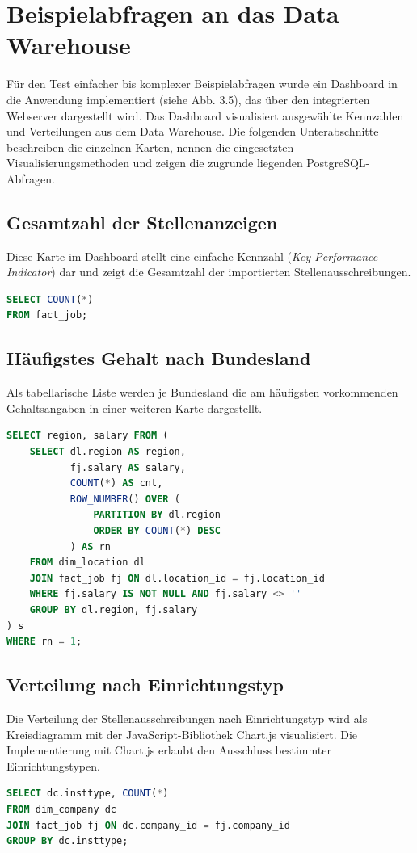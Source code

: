 \documentclass[
    a4paper,
    12pt,
    headinclude=true,
    BCOR=10mm,
]{scrreprt}
\begin{document}
\section{Beispielabfragen an das Data Warehouse}
Für den Test einfacher bis komplexer Beispielabfragen wurde ein Dashboard in die Anwendung implementiert (siehe Abb. 3.5), das über den integrierten Webserver dargestellt wird. Das Dashboard visualisiert ausgewählte Kennzahlen und Verteilungen aus dem Data Warehouse. Die folgenden Unterabschnitte beschreiben die einzelnen Karten, nennen die eingesetzten Visualisierungsmethoden und zeigen die zugrunde liegenden PostgreSQL-Abfragen.

\subsection{Gesamtzahl der Stellenanzeigen}
Diese Karte im Dashboard stellt eine einfache Kennzahl (\emph{Key Performance Indicator}) dar und zeigt die Gesamtzahl der importierten Stellenausschreibungen.
\begin{lstlisting}[language=SQL]
SELECT COUNT(*)
FROM fact_job;
\end{lstlisting}

\subsection{Häufigstes Gehalt nach Bundesland}
Als tabellarische Liste werden je Bundesland die am häufigsten vorkommenden Gehaltsangaben in einer weiteren Karte dargestellt.
\begin{lstlisting}[language=SQL]
SELECT region, salary FROM (
    SELECT dl.region AS region,
           fj.salary AS salary,
           COUNT(*) AS cnt,
           ROW_NUMBER() OVER (
               PARTITION BY dl.region
               ORDER BY COUNT(*) DESC
           ) AS rn
    FROM dim_location dl
    JOIN fact_job fj ON dl.location_id = fj.location_id
    WHERE fj.salary IS NOT NULL AND fj.salary <> ''
    GROUP BY dl.region, fj.salary
) s
WHERE rn = 1;
\end{lstlisting}

\subsection{Verteilung nach Einrichtungstyp}
Die Verteilung der Stellenausschreibungen nach Einrichtungstyp wird als Kreisdiagramm mit der JavaScript-Bibliothek Chart.js visualisiert. Die Implementierung mit Chart.js erlaubt den Ausschluss bestimmter Einrichtungstypen.
\begin{lstlisting}[language=SQL]
SELECT dc.insttype, COUNT(*)
FROM dim_company dc
JOIN fact_job fj ON dc.company_id = fj.company_id
GROUP BY dc.insttype;
\end{lstlisting}
\end{document}
